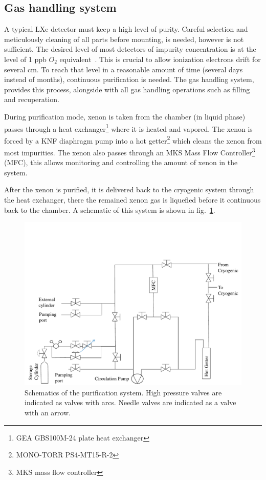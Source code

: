 \subsection{Gas handling system}
\label{subsec:gas}

A typical LXe detector must keep a high level of purity. Careful selection and meticulously cleaning of all parts before mounting, 
is needed, however is not sufficient. The desired level of most detectors of impurity concentration is at the level of 1 ppb $O_2$ 
equivalent~\cite{Aprile:2009dv}. This is crucial to allow ionization electrons drift for several cm. To reach that level in a 
reasonable amount of time (several days instead of months), continuous purification is needed. The gas handling system, provides this process, 
alongside with all gas handling operations such as filling and recuperation.

During purification mode, xenon is taken from the chamber (in liquid phase)
passes through a heat exchanger\footnote{GEA GBS100M-24 plate heat exchanger} where it is heated and vapored. The xenon is forced 
by a KNF diaphragm pump into a hot getter\footnote{MONO-TORR
PS4-MT15-R-2} which cleans the xenon from most impurities. The xenon
also passes through an MKS Mass Flow Controller\footnote{MKS mass flow controller} (MFC), this allows monitoring and controlling the amount of xenon in the system. 

After the xenon is purified, it is delivered back to the cryogenic system through the heat exchanger, there the remained xenon gas is 
liquefied before it continuous back to the chamber. A schematic of this system is shown in fig.~\ref{fig:gasSchematic}.


\begin{figure}[t!]
\centerline{\includegraphics[width=1.\linewidth]{GasSchematics.pdf}}
\caption{Schematics of the purification system. High pressure valves are indicated as valves with arcs. Needle valves are indicated as 
a valve with an arrow.}
\label{fig:gasSchematic}
\end{figure}

